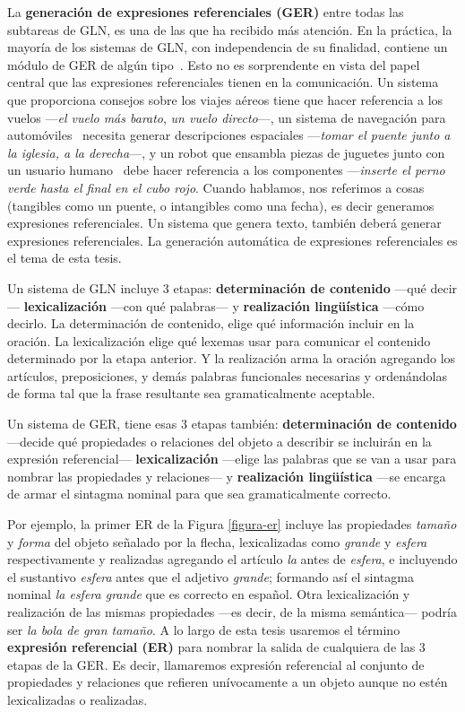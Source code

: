 La \textbf {generaci\'on de expresiones referenciales (GER)} entre todas las subtareas de GLN, es una de las que ha recibido m\'as atenci\'on. En la pr\'actica, la mayor\'ia de los sistemas de GLN, con independencia de su finalidad, contiene un m\'odulo de GER de alg\'un tipo~\cite{Mellish2004}. Esto no es sorprendente
en vista del papel central que las expresiones referenciales tienen en la comunicaci\'on. Un sistema que proporciona
consejos sobre los viajes a\'ereos \cite{white2010generating} tiene que hacer referencia a los vuelos ---{\it el vuelo m\'as barato}, {\it un vuelo directo}---, un sistema de navegaci\'on para autom\'oviles~\cite{Drager:2012:GLN:2380816.2380908}
necesita generar descripciones espaciales ---{\it tomar el puente junto a la iglesia, a la derecha}---,
y un robot que ensambla piezas de juguetes junto con un usuario humano~\cite{foster-etal-ijcai2009} debe hacer referencia a los componentes ---{\it inserte el perno verde hasta el final en el cubo rojo}. Cuando hablamos, nos referimos a cosas (tangibles como un puente, o intangibles como una fecha), es decir generamos expresiones referenciales. Un sistema que genera texto, tambi\'en deber\'a generar expresiones referenciales. La generaci\'on autom\'atica de expresiones referenciales es el tema de esta tesis.

Un sistema de GLN incluye 3 etapas: {\bf determinaci\'on de contenido} ---qu\'e decir--- {\bf lexicalizaci\'on} ---con qu\'e palabras--- y {\bf realizaci\'on ling\"{u}\'istica} ---c\'omo decirlo. La determinaci\'on de contenido, elige qu\'e informaci\'on incluir en la oraci\'on. La lexicalizaci\'on elige qu\'e lexemas usar para comunicar el contenido determinado por la etapa anterior. Y la realizaci\'on arma la oraci\'on agregando los art\'iculos, preposiciones, y dem\'as palabras funcionales necesarias y orden\'andolas de forma tal que la frase resultante sea gramaticalmente aceptable. 

Un sistema de GER, tiene esas 3 etapas tambi\'en: {\bf determinaci\'on de contenido} ---decide qu\'e propiedades o relaciones del objeto a describir se incluir\'an en la expresi\'on referencial--- {\bf lexicalizaci\'on} ---elige las palabras que se van a usar para nombrar las propiedades y relaciones--- y {\bf realizaci\'on ling\"u\'istica} ---se encarga de armar el sintagma nominal para que sea gramaticalmente correcto.

Por ejemplo, la primer ER de la Figura \ref{figura-er} incluye las propiedades {\it tama\~no} y {\it forma} del objeto se\~nalado por la flecha, lexicalizadas como {\it grande} y {\it esfera} respectivamente y realizadas agregando el art\'iculo {\it la} antes de {\it esfera}, e incluyendo el sustantivo {\it esfera} antes que el adjetivo {\it grande}; formando as\'i el sintagma nominal {\it la esfera grande} que es correcto en espa\~nol. Otra lexicalizaci\'on y realizaci\'on de las mismas propiedades ---es decir, de la misma sem\'antica--- podr\'ia ser {\it la bola de gran tama\~no}. A lo largo de esta tesis usaremos el t\'ermino {\bf expresi\'on referencial (ER)} para nombrar la salida de cualquiera de las 3 etapas de la GER. Es decir, llamaremos expresi\'on referencial al conjunto de propiedades y relaciones que refieren un\'ivocamente a un objeto aunque no est\'en lexicalizadas o realizadas.

